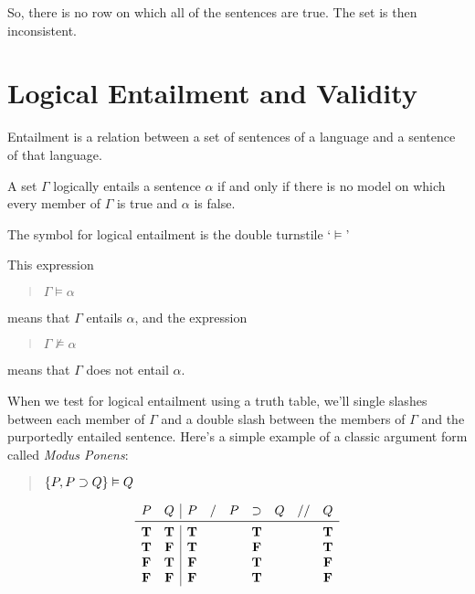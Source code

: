 \documentclass[../logic-text.tex]{subfiles}
\begin{document}
So, there is no row on which all of the sentences are true.
The set is then inconsistent.



\section{Logical Entailment and Validity}
\label{sec:logic-enta-valid}

Entailment is a relation between a set of sentences of a language and a sentence of that language.

A set \(\Gamma\) logically entails a sentence \(\alpha\) if and only if there is no model on which every member of \(\Gamma\) is true and \(\alpha\) is false.

The symbol for logical entailment is the double turnstile \enquote*{\(\vDash\)}

This expression

\begin{quote}
  \(\Gamma \vDash \alpha\)
\end{quote}

means that \(\Gamma\) entails \(\alpha\), and the expression

\begin{quote}
  \(\Gamma \nvDash \alpha\)
\end{quote}

means that \(\Gamma\) does not entail \(\alpha\).


When we test for logical entailment using a truth table, we'll single slashes between each member of \(\Gamma\) and a double slash between the members of \(\Gamma\) and the purportedly entailed sentence.
Here's a simple example of a classic argument form called \emph{Modus Ponens}:

\begin{quote}
\(\{P, P \supset Q\} \vDash Q\)
\end{quote}


\[
  \begin{array}{cc|ccccccc}
    P & Q & P & / & P & \lif & Q & // & Q \\ \midrule
    \true & \true & \true &&& \true &&& \true \\
    \true & \false  & \true &&& \false &&& \true \\
    \false & \true & \false &&& \true &&&  \false \\
    \false & \false  & \false &&& \true &&& \false \\
  \end{array}
\]
\end{document}
